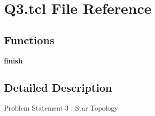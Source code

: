 \hypertarget{Q3_8tcl}{}\section{Q3.\+tcl File Reference}
\label{Q3_8tcl}
\subsection*{Functions}
\begin{DoxyCompactItemize}
\item 
\mbox{\label{Q3_8tcl_a30728837c246b65ef76298af0101d99c}} 
{\bfseries finish}
\end{DoxyCompactItemize}


\subsection{Detailed Description}
Problem Statement 3 \+: Star Topology

\begin{DoxyVerb}
\end{DoxyVerb}
